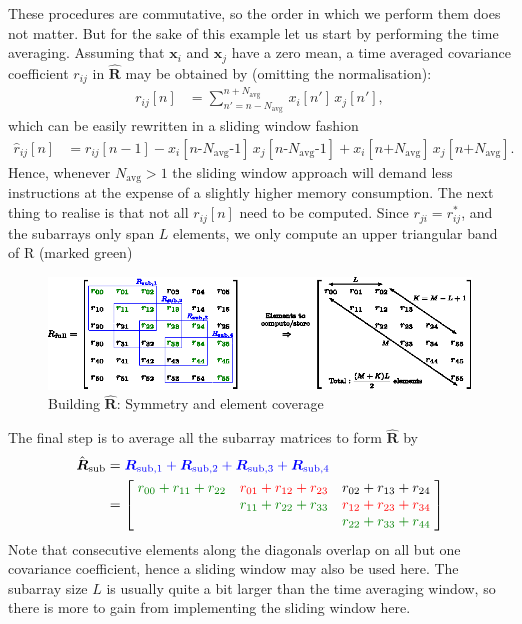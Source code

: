 \documentclass[10pt,a4paper]{article}
\newenvironment{narrow}[2]{%
\begin{list}{}{%
\setlength{\topsep}{0pt}%
\setlength{\leftmargin}{#1}%
\setlength{\rightmargin}{#2}%
\setlength{\listparindent}{\parindent}%
\setlength{\itemindent}{\parindent}%
\setlength{\parsep}{\parskip}}%
\item[]}{\end{list}}
\newcommand\Green[1]{{\color{Green}#1}}
\newcommand\sumb[2]{\sum\limits_{#1}^{#2}\,}
\renewcommand\vec[1]{\boldsymbol{#1}}
\newcommand\mat[1]{\boldsymbol{#1}}
\newcommand\1{\vec 1}
\begin{document}
These procedures are commutative, so the order in which we perform them does not matter. But for the sake of this example let us start by performing the time averaging. Assuming that $\vec x_i$ and $\vec x_j$ have a zero mean, a time averaged covariance coefficient $r_{ij}$ in $\hat{\mat R}$ may be obtained by (omitting the normalisation):
\begin{align*}
r_{ij}[n] &= \sumb{n'=n-N_{\text{avg}}}{n+N_{\text{avg}}} x_i[n']\,x_j[n'],
\end{align*}
which can be easily rewritten in a sliding window fashion
\begin{align*}
\hat r_{ij}[n] &= r_{ij}[n-1] - x_i[n\text{-}N_\text{avg}\text{-}1]\,x_j[n\text{-}N_\text{avg}\text{-}1]
                         + x_i[n\text{+}N_\text{avg}]\,x_j[n\text{+}N_\text{avg}].
\end{align*}
Hence, whenever $N_\text{avg}>1$ the sliding window approach will demand less instructions at the expense of a slightly higher memory consumption. The next thing to realise is that not all $r_{ij}[n]$ need to be computed. Since $r_{ji} = r^*_{ij}$, and the subarrays only span $L$ elements, we only compute an upper triangular band of R (marked \Green{green})
\begin{figure}[H]
\includegraphics[width=\linewidth]{gfx/capon_build_R_full.eps}
\caption{Building $\hat{\mat R}$: Symmetry and element coverage}\label{buildingRfull}
\end{figure}
The final step is to average all the subarray matrices to form $\hat{\mat R}$ by 
{\renewcommand*{\arraystretch}{1.8}
\begin{align*}
\hat{\mat R}_\text{sub} &= {\color{Blue}\mat R_{\text{sub},1} + \mat R_{\text{sub},2} + \mat R_{\text{sub},3} + \mat R_{\text{sub},4}} \\
&= \left[\;
\begin{matrix}
\color{Green}r_{00}+r_{11}+r_{22} & \color{Red}r_{01}+r_{12}+r_{23} & r_{02}+r_{13}+r_{24} \\
                                       & \color{Green}r_{11}+r_{22}+r_{33} & \color{Red}r_{12}+r_{23}+r_{34} \\
                                       &                                        & \color{Green}r_{22}+r_{33}+r_{44}
\end{matrix}
\;\right]
\end{align*}}%
Note that consecutive elements along the diagonals overlap on all but one covariance coefficient, hence a sliding window may also be used here. The subarray size $L$ is usually quite a bit larger than the time averaging window, so there is more to gain from implementing the sliding window here.\\\\
\end{document}
